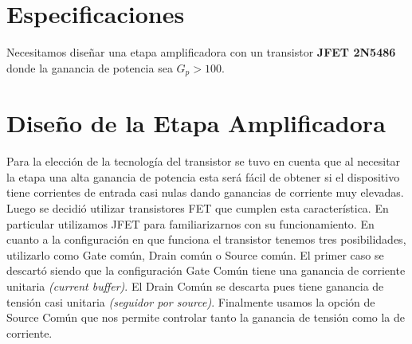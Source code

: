 \documentclass[a4paper, 10pt, spanish]{article}
\begin{document}
%
%
\setcounter{page}{1}

%
%
\tableofcontents
\newpage


\section{Especificaciones}

Necesitamos diseñar una etapa amplificadora con un transistor \textbf{JFET 2N5486} donde la ganancia de potencia sea $G_p > 100$.

\section{Diseño de la Etapa Amplificadora}

Para la elección de la tecnología del transistor se tuvo en cuenta que al necesitar la etapa una alta ganancia de potencia esta será fácil de obtener si el dispositivo tiene corrientes de entrada casi nulas dando ganancias de corriente muy elevadas. Luego se decidió utilizar transistores FET que cumplen esta característica. En particular utilizamos JFET para familiarizarnos con su funcionamiento. En cuanto a la configuración en que funciona el transistor tenemos tres posibilidades, utilizarlo como Gate común, Drain común o Source común. El primer caso se descartó siendo que la configuración Gate Común tiene una ganancia de corriente unitaria \textit{(current buffer)}. El Drain Común se descarta pues tiene ganancia de tensión casi unitaria \textit{(seguidor por source)}. Finalmente usamos la opción de Source Común que nos permite controlar tanto la ganancia de tensión como la de corriente.
\end{document}
